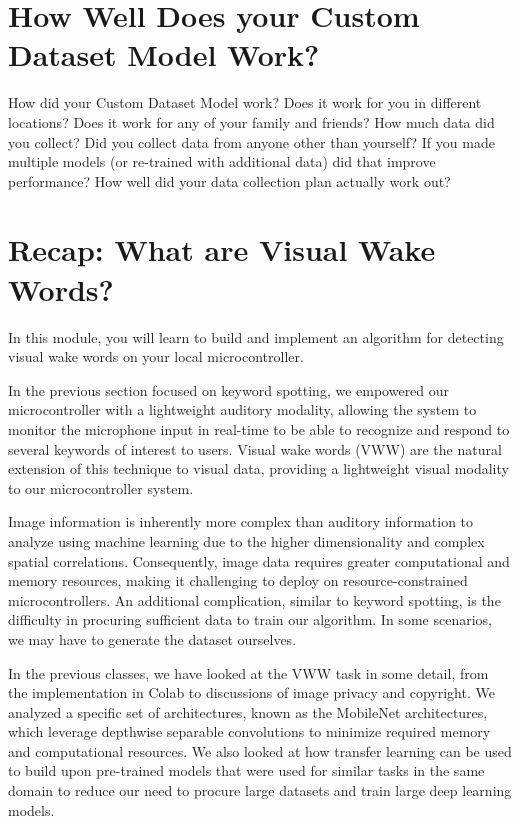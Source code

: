 \section{How Well Does your Custom Dataset Model Work?}

How did your Custom Dataset Model work? Does it work for you in different locations? Does it work for any of your family and friends? How much data did you collect? Did you collect data from anyone other than yourself? If you made multiple models (or re-trained with additional data) did that improve performance? How well did your data collection plan actually work out?    



\section{Recap: What are Visual Wake Words?}
    In this module, you will learn to build and implement an algorithm for detecting visual wake words on your local microcontroller.
    
    In the previous section focused on keyword spotting, we empowered our microcontroller with a lightweight auditory modality, allowing the system to monitor the microphone input in real-time to be able to recognize and respond to several keywords of interest to users. Visual wake words (VWW) are the natural extension of this technique to visual data, providing a lightweight visual modality to our microcontroller system.
    
    Image information is inherently more complex than auditory information to analyze using machine learning due to the higher dimensionality and complex spatial correlations. Consequently, image data requires greater computational and memory resources, making it challenging to deploy on resource-constrained microcontrollers. An additional complication, similar to keyword spotting, is the difficulty in procuring sufficient data to train our algorithm. In some scenarios, we may have to generate the dataset ourselves.
    
    In the previous classes, we have looked at the VWW task in some detail, from the implementation in Colab to discussions of image privacy and copyright. We analyzed a specific set of architectures, known as the MobileNet architectures, which leverage depthwise separable convolutions to minimize required memory and computational resources. We also looked at how transfer learning can be used to build upon pre-trained models that were used for similar tasks in the same domain to reduce our need to procure large datasets and train large deep learning models.
    
